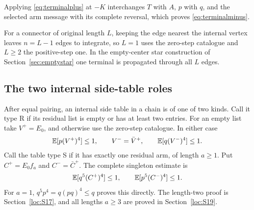 Applying \eqref{eq:terminalplus} at $-K$ interchanges $T$ with $A$, $p$ with $q$, and the selected arm message with its complete reversal, which proves \eqref{eq:terminalminus}.

For a connector of original length $L$, keeping the edge nearest the internal vertex leaves $n=L-1$ edges to integrate, so $L=1$ uses the zero-step catalogue and $L\ge2$ the positive-step one. In the empty-center star construction of Section~\ref{sec:emptystar} one terminal is propagated through all $L$ edges.

\subsection{The two internal side-table roles}
After equal pairing, an internal side table in a chain is of one of two kinds. Call it type R if its residual list is empty or has at least two entries. For an empty list take $V^+=E_0$, and otherwise use the zero-step catalogue. In either case
\begin{equation}\label{eq:R}
 \mathbb E[p(V^+)^4]\le1,\qquad V^-=\bar V^+,
 \qquad \mathbb E[q(V^-)^4]\le1.
\end{equation}
Call the table type S if it has exactly one residual arm, of length $a\ge1$. Put $C^+=E_0f_a$ and $C^-=\bar C^+$. The complete singleton estimate is
\begin{equation}\label{eq:S}
 \mathbb E[q^5(C^+)^4]\le1,\qquad \mathbb E[p^5(C^-)^4]\le1.
\end{equation}
For $a=1$, $q^5p^4=q(pq)^4\le q$ proves this directly. The length-two proof is Section~\ref{loc:S17}, and all lengths $a\ge3$ are proved in Section~\ref{loc:S19}.
